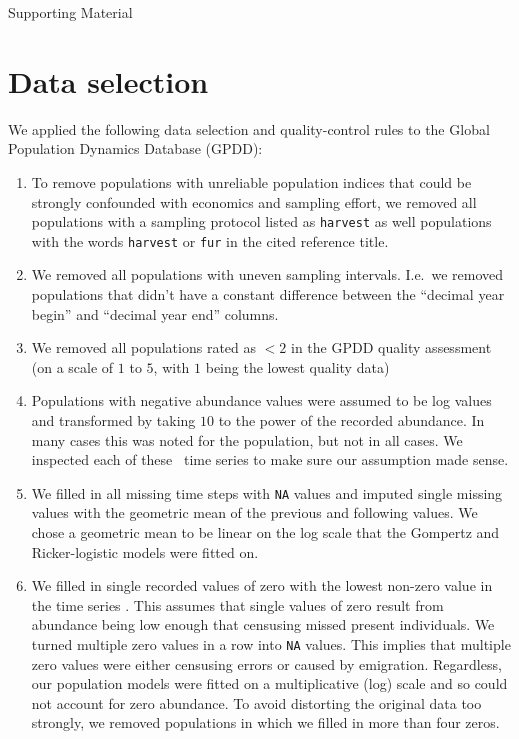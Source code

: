 
\begin{centering}
\LARGE
Supporting Material\\[1.0em]
\end{centering}

\section{Data selection}

We applied the following data selection and quality-control rules to the Global
Population Dynamics Database (GPDD):

\begin{enumerate}

\item To remove populations with unreliable population indices that could be
  strongly confounded with economics and sampling effort, we removed all
  populations with a sampling protocol listed as \texttt{harvest} as well
  populations with the words \texttt{harvest} or \texttt{fur} in the cited
  reference title.

\item We removed all populations with uneven sampling intervals. I.e.~we removed
  populations that didn't have a constant difference between the ``decimal year
  begin'' and ``decimal year end'' columns.

\item We removed all populations rated as $< 2$ in the GPDD quality assessment
  (on a scale of $1$ to $5$, with $1$ being the lowest quality data)
  \citep[following][]{sibly2005, ziebarth2010}

\item Populations with negative abundance values were assumed to be log values
  and transformed by taking $10$ to the power of the recorded abundance. In many
  cases this was noted for the population, but not in all cases. We inspected
  each of these \totalAssumedLog~time series to make sure our assumption made
  sense.

\item We filled in all missing time steps with \texttt{NA} values and imputed
  single missing values with the geometric mean of the previous and following
  values. We chose a geometric mean to be linear on the log scale that the
  Gompertz and Ricker-logistic models were fitted on.

\item We filled in single recorded values of zero with the lowest non-zero value
  in the time series \citep[following][]{brook2006a}. This assumes that single
  values of zero result from abundance being low enough that censusing missed
  present individuals. We turned multiple zero values in a row into \texttt{NA}
  values. This implies that multiple zero values were either censusing errors or
  caused by emigration. Regardless, our population models were fitted on
  a multiplicative (log) scale and so could not account for zero abundance. To
  avoid distorting the original data too strongly, we removed populations in
  which we filled in more than four zeros.


\end{enumerate}
